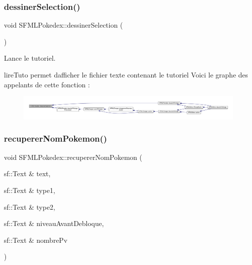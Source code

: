 \subsubsection{\texorpdfstring{dessiner\+Selection()}{dessinerSelection()}}
{\footnotesize\ttfamily void S\+F\+M\+L\+Pokedex\+::dessiner\+Selection (\begin{DoxyParamCaption}{ }\end{DoxyParamCaption})\hspace{0.3cm}{\ttfamily [private]}}



Lance le tutoriel. 

lire\+Tuto permet d\textquotesingle{}afficher le fichier texte contenant le tutoriel Voici le graphe des appelants de cette fonction \+:\nopagebreak
\begin{figure}[H]
\begin{center}
\leavevmode
\includegraphics[width=350pt]{class_s_f_m_l_pokedex_a4cec507ffcc5916c32c8b14211c991fa_icgraph}
\end{center}
\end{figure}
\mbox{\label{class_s_f_m_l_pokedex_a3729d8001348235c5ad12245cdb61b28}} 
\subsubsection{\texorpdfstring{recuperer\+Nom\+Pokemon()}{recupererNomPokemon()}}
{\footnotesize\ttfamily void S\+F\+M\+L\+Pokedex\+::recuperer\+Nom\+Pokemon (\begin{DoxyParamCaption}\item[{sf\+::\+Text \&}]{text,  }\item[{sf\+::\+Text \&}]{type1,  }\item[{sf\+::\+Text \&}]{type2,  }\item[{sf\+::\+Text \&}]{niveau\+Avant\+Debloque,  }\item[{sf\+::\+Text \&}]{nombre\+Pv }\end{DoxyParamCaption})\hspace{0.3cm}{\ttfamily [private]}}



